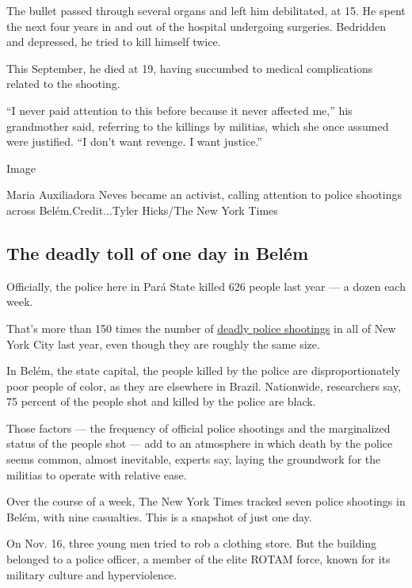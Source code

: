 The bullet passed through several organs and left him debilitated, at
15. He spent the next four years in and out of the hospital undergoing
surgeries. Bedridden and depressed, he tried to kill himself twice.

This September, he died at 19, having succumbed to medical complications
related to the shooting.

``I never paid attention to this before because it never affected me,''
his grandmother said, referring to the killings by militias, which she
once assumed were justified. ``I don't want revenge. I want justice.''

Image

Maria Auxiliadora Neves became an activist, calling attention to police
shootings across Belém.Credit...Tyler Hicks/The New York Times

\hypertarget{the-deadly-toll-of-one-day-in-beluxe9m}{%
\subsection{The deadly toll of one day in
Belém}\label{the-deadly-toll-of-one-day-in-beluxe9m}}

Officially, the police here in Pará State killed 626 people last year
--- a dozen each week.

That's more than 150 times the number of
\href{https://www.nytimes.com/2019/10/25/nyregion/police-involved-shooting-brooklyn.html}{deadly
police shootings} in all of New York City last year, even though they
are roughly the same size.

In Belém, the state capital, the people killed by the police are
disproportionately poor people of color, as they are elsewhere in
Brazil. Nationwide, researchers say, 75 percent of the people shot and
killed by the police are black.

Those factors --- the frequency of official police shootings and the
marginalized status of the people shot --- add to an atmosphere in which
death by the police seems common, almost inevitable, experts say, laying
the groundwork for the militias to operate with relative ease.

Over the course of a week, The New York Times tracked seven police
shootings in Belém, with nine casualties. This is a snapshot of just one
day.

On Nov. 16, three young men tried to rob a clothing store. But the
building belonged to a police officer, a member of the elite ROTAM
force, known for its military culture and hyperviolence.

